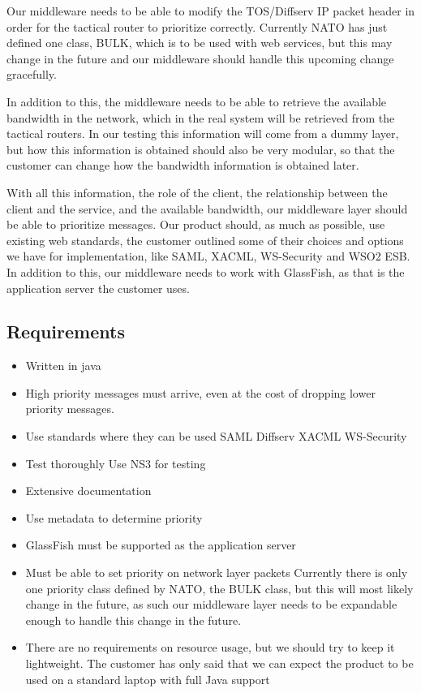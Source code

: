 \documentclass[12pt]{article}
\begin{document}
        Our middleware needs to be able to modify the TOS/Diffserv IP packet header in order for the tactical router to prioritize correctly. Currently NATO has just defined one class, BULK, which is to be used with web services, but this may change in the future and our middleware should handle this upcoming change gracefully.

        In addition to this, the middleware needs to be able to retrieve the available bandwidth in the network, which in the real system will be retrieved from the tactical routers. In our testing this information will come from a dummy layer, but how this information is obtained should also be very modular, so that the customer can change how the bandwidth information is obtained later.

        With all this information, the role of the client, the relationship between the client and the service, and the available bandwidth, our middleware layer should be able to prioritize messages. Our product should, as much as possible, use existing web standards, the customer outlined some of their choices and options we have for implementation, like SAML, XACML, WS-Security and WSO2 ESB. In addition to this, our middleware needs to work with GlassFish, as that is the application server the customer uses.
    \subsection{Requirements}\label{taskreq}
    \begin{itemize}
        \item Written in java
        \item High priority messages must arrive, even at the cost of dropping lower priority messages.
        \item Use standards where they can be used
            \subitem SAML
            \subitem Diffserv
            \subitem XACML
            \subitem WS-Security
        \item Test thoroughly
            \subitem Use NS3 for testing
        \item Extensive documentation
        \item Use metadata to determine priority
        \item GlassFish must be supported as the application server
        \item Must be able to set priority on network layer packets
            \subitem Currently there is only one priority class defined by NATO, the BULK class, but this will most likely change in the future, as such our middleware layer needs to be expandable enough to handle this change in the future.
        \item There are no requirements on resource usage, but we should try to keep it lightweight.
            \subitem The customer has only said that we can expect the product to be used on a standard laptop with full Java support
    \end{itemize}
\end{document}

